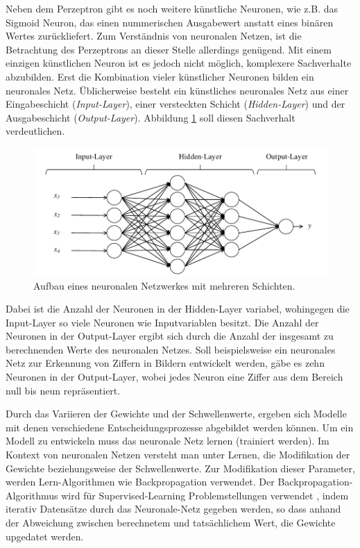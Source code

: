 Neben dem Perzeptron gibt es noch weitere künstliche Neuronen, wie z.B. das Sigmoid Neuron, das einen nummerischen Ausgabewert anstatt eines binären Wertes zurückliefert. Zum Verständnis von neuronalen Netzen, ist die Betrachtung des Perzeptrons an dieser Stelle allerdings genügend. Mit einem einzigen künstlichen Neuron ist es jedoch nicht möglich, komplexere Sachverhalte abzubilden. Erst die Kombination vieler künstlicher Neuronen bilden ein neuronales Netz. Üblicherweise besteht ein künstliches neuronales Netz aus einer Eingabeschicht (\emph{Input-Layer}), einer versteckten Schicht (\emph{Hidden-Layer}) und der Ausgabeschicht (\emph{Output-Layer}). Abbildung \ref{fig:multilayerNN} soll diesen Sachverhalt verdeutlichen. 

\begin{figure}[ht]
\centering
\includegraphics{images/multilayerNN.pdf}
\caption{Aufbau eines neuronalen Netzwerkes mit mehreren Schichten.}
\label{fig:multilayerNN}
\end{figure}

Dabei ist die Anzahl der Neuronen in der Hidden-Layer variabel, wohingegen die Input-Layer so viele Neuronen wie Inputvariablen besitzt. Die Anzahl der Neuronen in der Output-Layer ergibt sich durch die Anzahl der insgesamt zu berechnenden Werte des neuronalen Netzes. Soll beispielsweise ein neuronales Netz zur Erkennung von Ziffern in Bildern entwickelt werden, gäbe es zehn Neuronen in der Output-Layer, wobei jedes Neuron eine Ziffer aus dem Bereich null bis neun repräsentiert.    

Durch das Variieren der Gewichte und der Schwellenwerte, ergeben sich Modelle mit denen verschiedene Entscheidungsprozesse abgebildet werden können. Um ein Modell zu entwickeln muss das neuronale Netz lernen (trainiert werden). Im Kontext von neuronalen Netzen versteht man unter Lernen, die Modifikation der Gewichte beziehungsweise der Schwellenwerte. Zur Modifikation dieser Parameter, werden Lern-Algorithmen wie Backpropagation verwendet. Der Backpropagation-Algorithmus wird für Supervised-Learning Problemstellungen verwendet \cite [vgl. S. 89] {EA16}, indem iterativ Datensätze durch das Neuronale-Netz gegeben werden, so dass anhand der Abweichung zwischen berechnetem und tatsächlichem Wert, die Gewichte upgedatet werden.         



